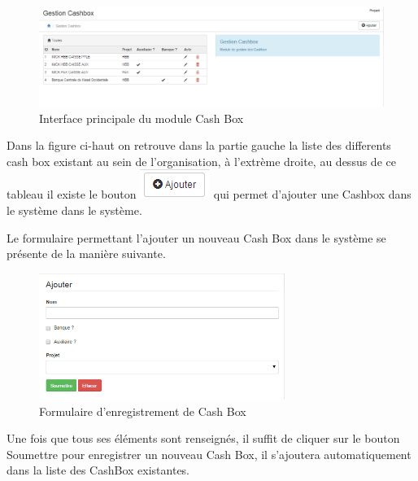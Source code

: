 \documentclass[12pt,a4paper]{report}
\begin{document}
\begin{figure}[h]
\begin{center}
\includegraphics[width=14cm]{pic/GestCashBox.png}
\end{center}
\caption{Interface principale du module Cash Box}
\label{Interface principale du module Cash Box}
\end{figure} 

Dans la figure ci-haut on retrouve dans la partie gauche la liste des differents cash box existant au sein de l'organisation, à l'extrème droite, au dessus de ce tableau il existe le bouton \includegraphics[scale=1]{pic/AddNewStore.png} qui permet d'ajouter une Cashbox dans le système dans le système.

Le formulaire permettant l'ajouter un nouveau Cash Box dans le système se présente de la manière suivante.
\begin{figure}[h]
\begin{center}
\includegraphics[width=8cm]{pic/FormAddCash.png}
\end{center}
\caption{Formulaire d'enregistrement de Cash Box}
\label{Formulaire d'enregistrement de Cash Box}
\end{figure} 

Une fois que tous ses éléments sont renseignés, il suffit de cliquer sur le bouton Soumettre pour enregistrer un nouveau Cash Box, il s'ajoutera automatiquement dans la liste des CashBox existantes. 
\end{document}
